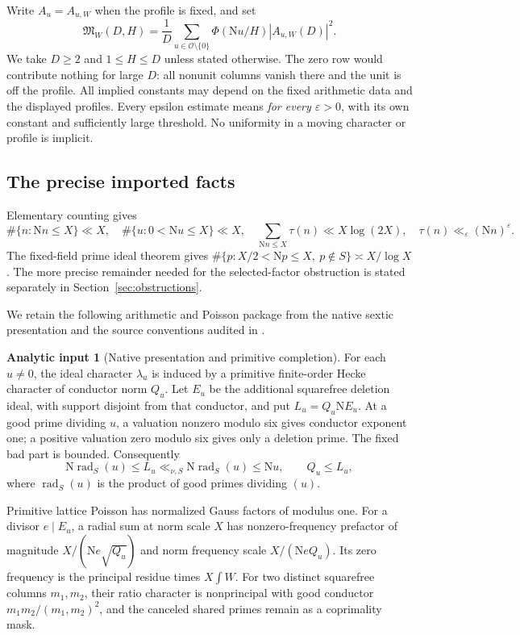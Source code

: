 \documentclass[11pt]{article}
\numberwithin{equation}{section}
\theoremstyle{definition}
\newtheorem{assumption}[theorem]{Analytic input}
\theoremstyle{remark}
\newcommand{\N}{\mathrm N}
\newcommand{\OO}{\mathcal O}
\newcommand{\rad}{\operatorname{rad}}
\newcommand{\Mfrak}{\mathfrak M}
\newcommand{\eps}{\varepsilon}
\begin{document}
Write \(A_u=A_{u,W}\) when the profile is fixed, and set
\begin{equation}\label{eq:moment}
 \Mfrak_W(D,H)=\frac1D\sum_{u\in\OO\setminus\{0\}}
    \Phi(\N u/H)|A_{u,W}(D)|^2.
\end{equation}
We take \(D\ge2\) and \(1\le H\le D\) unless stated otherwise.
The zero row would contribute nothing for large \(D\):
all nonunit columns vanish there and the unit is off the profile.
All implied constants may depend on the fixed arithmetic data and
the displayed profiles. Every epsilon estimate means \emph{for every
\(\eps>0\)}, with its own constant and sufficiently large threshold.
No uniformity in a moving character or profile is implicit.

\subsection{The precise imported facts}

Elementary counting gives
\[
 \#\{n:\N n\le X\}\ll X,\quad
 \#\{u:0<\N u\le X\}\ll X,\quad
 \sum_{\N n\le X}\tau(n)\ll X\log(2X),\quad
 \tau(n)\ll_\eps(\N n)^\eps.
\]
The fixed-field prime ideal theorem gives
\(\#\{p:X/2<\N p\le X,\ p\notin S\}\asymp X/\log X\).
The more precise remainder needed for the selected-factor obstruction
is stated separately in Section~\ref{sec:obstructions}.

We retain the following arithmetic and Poisson package from the native
sextic presentation and the source conventions audited in
\cite{N2,N3,N8,N11,OA5}.

\begin{assumption}[Native presentation and primitive completion]
\label{input:poisson}
For each \(u\ne0\), the ideal character \(\lambda_u\) is induced by a
primitive finite-order Hecke character of conductor norm \(Q_u\).
Let \(E_u\) be the additional squarefree deletion ideal, with support
disjoint from that conductor, and put \(L_u=Q_u\N E_u\).
At a good prime dividing \(u\), a valuation nonzero modulo six gives
conductor exponent one; a positive valuation zero modulo six gives
only a deletion prime. The fixed bad part is bounded. Consequently
\begin{equation}\label{eq:radical-modulus}
 \N\rad_S(u)\le L_u\ll_{\nu,S}\N\rad_S(u)\le \N u,
 \qquad Q_u\le L_u,
\end{equation}
where \(\rad_S(u)\) is the product of good primes dividing \((u)\).

Primitive lattice Poisson has normalized Gauss factors of modulus one.
For a divisor \(e\mid E_u\), a radial sum at norm scale \(X\)
has nonzero-frequency prefactor of magnitude
\(X/(\N e\sqrt{Q_u})\) and norm frequency scale
\(X/(\N e Q_u)\). Its zero frequency is the principal residue times
\(X\int W\).
For two distinct squarefree columns \(m_1,m_2\), their ratio character
is nonprincipal with good conductor
\(m_1m_2/(m_1,m_2)^2\), and the canceled shared primes remain as a
coprimality mask.
\end{assumption}
\end{document}
